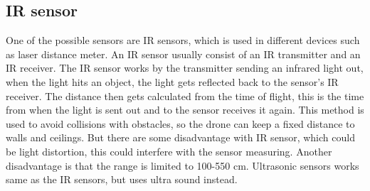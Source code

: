 \subsection*{IR sensor}
One of the possible sensors are IR sensors, which is used in different devices such as laser distance meter. An IR sensor usually consist of an IR transmitter and an IR receiver. 
The IR sensor works by the transmitter sending an infrared light out, when the light hits an object, the light gets reflected back to the sensor's IR receiver. The distance then gets calculated from the time of flight, this is the time from when the light is sent out and to the sensor receives it again. This method is used to avoid collisions with obstacles, so the drone can keep a fixed distance to walls and ceilings.  
\newline
\newline
But there are some disadvantage with IR sensor, which could be light distortion, this could interfere with the sensor measuring. Another disadvantage is that the range is limited to 100-550 cm. 
\newline
Ultrasonic sensors works same as the IR sensors, but uses ultra sound instead. 

